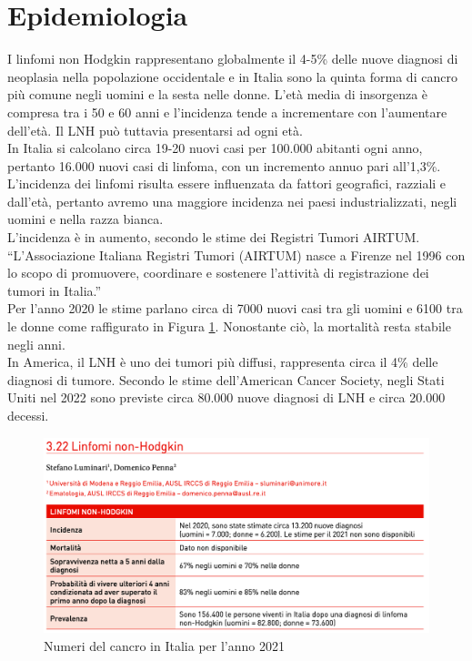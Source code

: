 \section{Epidemiologia}
I linfomi non Hodgkin rappresentano globalmente il 4-5\% delle nuove diagnosi di neoplasia nella popolazione 
occidentale e in Italia 
sono la quinta forma di cancro più comune negli uomini e la sesta nelle donne\cite{AIOM}. 
L’età media di insorgenza è compresa tra i 50 e 60 anni e l’incidenza tende a incrementare con l’aumentare dell’età. 
Il LNH può tuttavia presentarsi ad ogni età.\\ 
In Italia si calcolano circa 19-20 nuovi casi per 100.000 abitanti ogni anno, pertanto 16.000 nuovi casi di linfoma, 
con un incremento annuo pari all’1,3\%\cite{AIOM}.\\
L’incidenza dei linfomi risulta essere influenzata da fattori geografici, razziali e dall'età, 
pertanto avremo una maggiore incidenza nei paesi industrializzati, negli uomini e nella razza bianca\cite{AIOM}.\\
L’incidenza è in aumento, secondo le stime dei Registri Tumori AIRTUM. “L’Associazione Italiana Registri Tumori 
(AIRTUM) nasce a Firenze nel 1996 con lo scopo di promuovere, coordinare e sostenere l’attività di registrazione 
dei tumori in Italia\cite{AIRTUM}.”\\
Per l’anno 2020 le stime parlano circa di 7000 nuovi casi tra gli uomini e 6100 tra le donne come raffigurato 
in Figura \ref*{fig:FIGURE_2.2}. 
Nonostante ciò, la mortalità resta stabile negli anni\cite{AIRC}.\\
In America, il LNH è uno dei tumori più diffusi, rappresenta circa il 4\% delle diagnosi di tumore. 
Secondo le stime dell’American Cancer Society, negli Stati Uniti nel 2022 sono previste circa 80.000 nuove 
diagnosi di LNH e circa 20.000 decessi\cite{Americanstatistic}.\\

\begin{figure}[H]
    \begin{center}
    \includegraphics[width=0.8\columnwidth]{img/2021.png}
    \end{center}
    \caption{Numeri del cancro in Italia per l’anno 2021
    \cite{img4}}
    \label{fig:FIGURE_2.2}
\end{figure}

